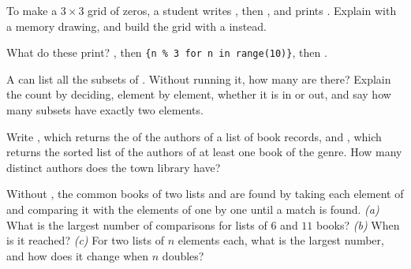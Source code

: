\begin{exercise}[$\star\star$]\label{exo:g10:tuples-sets-comprehensions:8}
To make a $3 \times 3$ grid of zeros, a student writes , then , and
prints \code{[[1, 0, 0], [1, 0, 0], [1, 0, 0]]}. Explain with a memory drawing, and build the grid with a
 instead.
\end{exercise}

\begin{exercise}[$\star\star$]\label{exo:g10:tuples-sets-comprehensions:9}
What do these print? , then
\texttt{\{n \% 3 for n in range(10)\}}, then .
\end{exercise}

\begin{exercise}[$\star\star$]\label{exo:g10:tuples-sets-comprehensions:10}
A  can list all the subsets of \code{["a", "b", "c", "d"]}. Without running it, how many are there?
Explain the count by deciding, element by element, whether it is in or out, and say how many subsets have exactly
two elements.
\end{exercise}

\begin{exercise}[$\star\star$]\label{exo:g10:tuples-sets-comprehensions:11}
Write , which returns the  of the authors of a list of book records, and
, which returns the sorted list of the authors of at least one book of the
genre. How many distinct authors does the town library have?
\end{exercise}

\begin{exercise}[$\star\star\star$]\label{exo:g10:tuples-sets-comprehensions:12}
Without , the common books of two lists  and  are found by taking each element of  and
comparing it with the elements of  one by one until a match is found. \emph{(a)} What is the largest number
of comparisons for lists of $6$ and $11$ books? \emph{(b)} When is it reached? \emph{(c)} For two lists of $n$
elements each, what is the largest number, and how does it change when $n$ doubles?
\end{exercise}

